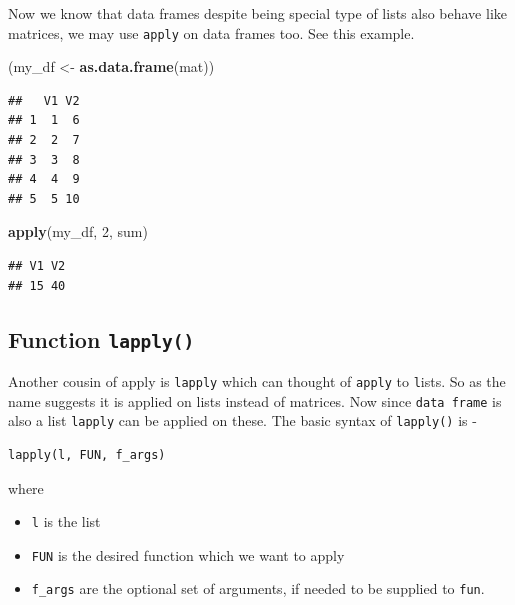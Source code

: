\documentclass[
]{book}
\newenvironment{Shaded}{\begin{snugshade}}{\end{snugshade}}
\newcommand{\DecValTok}[1]{\textcolor[rgb]{0.00,0.00,0.81}{#1}}
\newcommand{\FunctionTok}[1]{\textcolor[rgb]{0.13,0.29,0.53}{\textbf{#1}}}
\newcommand{\NormalTok}[1]{#1}
\newcommand{\OtherTok}[1]{\textcolor[rgb]{0.56,0.35,0.01}{#1}}
\providecommand{\tightlist}{%
  \setlength{\itemsep}{0pt}\setlength{\parskip}{0pt}}
\begin{document}
Now we know that data frames despite being special type of lists also behave like matrices, we may use \texttt{apply} on data frames too. See this example.

\begin{Shaded}
\begin{Highlighting}[]
\NormalTok{(my\_df }\OtherTok{\textless{}{-}} \FunctionTok{as.data.frame}\NormalTok{(mat))}
\end{Highlighting}
\end{Shaded}

\begin{verbatim}
##   V1 V2
## 1  1  6
## 2  2  7
## 3  3  8
## 4  4  9
## 5  5 10
\end{verbatim}

\begin{Shaded}
\begin{Highlighting}[]
\FunctionTok{apply}\NormalTok{(my\_df, }\DecValTok{2}\NormalTok{, sum)}
\end{Highlighting}
\end{Shaded}

\begin{verbatim}
## V1 V2 
## 15 40
\end{verbatim}

\hypertarget{function-lapply}{%
\subsection{\texorpdfstring{Function \texttt{lapply()}}{Function lapply()}}\label{function-lapply}}

Another cousin of apply is \texttt{lapply} which can thought of \texttt{apply} to \texttt{l}ists. So as the name suggests it is applied on lists instead of matrices. Now since \texttt{data\ frame} is also a list \texttt{lapply} can be applied on these. The basic syntax of \texttt{lapply()} is -

\begin{verbatim}
lapply(l, FUN, f_args)
\end{verbatim}

where

\begin{itemize}
\tightlist
\item
  \texttt{l} is the list
\item
  \texttt{FUN} is the desired function which we want to apply
\item
  \texttt{f\_args} are the optional set of arguments, if needed to be supplied to \texttt{fun}.
\end{itemize}
\end{document}
